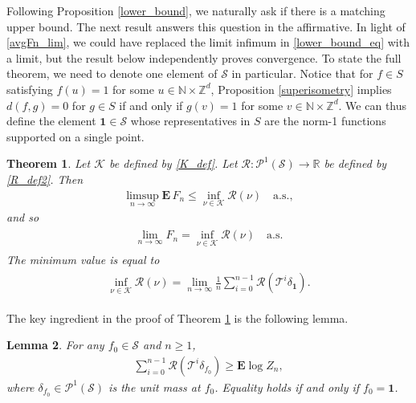 \documentclass[11pt,reqno]{amsart}
\numberwithin{equation}{section}
\newtheorem{thm}{Theorem}[section]
\newtheorem{lemma}[thm]{Lemma}
\theoremstyle{definition}
\begin{document}
Following Proposition \ref{lower_bound}, we naturally ask if there is a matching upper bound.
The next result answers this question in the affirmative.
In light of \eqref{avgFn_lim}, we could have replaced the limit infimum in \eqref{lower_bound_eq} with a limit, but the result below independently proves convergence.
To state the full theorem, we need to denote one element of ${\mathcal{S}}$ in particular.
Notice that for $f \in S$ satisfying $f(u) = 1$ for some $u \in {\mathbb{N}} \times {\mathbb{Z}}^d$, Proposition \ref{superisometry} implies $d(f,g) = 0$ for $g \in S$ if and only if $g(v) = 1$ for some $v \in {\mathbb{N}} \times {\mathbb{Z}}^d$.
We can thus define the element ${{\boldsymbol {1}}} \in {\mathcal{S}}$ whose representatives in $S$ are the norm-1 functions supported on a single point.

\begin{thm} \label{upper_bound}
Let ${\mathcal{K}}$ be defined by \eqref{K_def}.  
Let ${\mathcal{R}} : {\mathcal{P}}^1({\mathcal{S}}) \to {\mathbb{R}}$ be defined by \eqref{R_def2}.
Then
{\begin{align*} {
\limsup_{n \to \infty} {\mathbf{E}}\, F_n \leq \inf_{\nu \in {\mathcal{K}}} {\mathcal{R}}(\nu) \quad \mathrm{a.s.},
} \end{align*}}
and so
{\begin{align} \begin{split} {
\lim_{n \to \infty} F_n = \inf_{\nu \in {\mathcal{K}}} {\mathcal{R}}(\nu) \quad \mathrm{a.s.} \label{limit}
} \end{split} \end{align}}
The minimum value is equal to
{\begin{align} \begin{split} {
\inf_{\nu \in {\mathcal{K}}} {\mathcal{R}}(\nu) = \lim_{n \to \infty} \frac{1}{n} \sum_{i = 0}^{n-1} {\mathcal{R}}({\mathcal{T}}^i\delta_{{{\boldsymbol {1}}}}). \label{minimal_value}
} \end{split} \end{align}}
\end{thm}
The key ingredient in the proof of Theorem \ref{upper_bound} is the following lemma.

\begin{lemma} \label{upper_bound_lemma}
For any $f_0 \in {\mathcal{S}}$ and $n \geq 1$,
{\begin{align*} {
\sum_{i = 0}^{n-1} {\mathcal{R}}({\mathcal{T}}^i \delta_{f_0}) \geq {\mathbf{E}}\log Z_n,
} \end{align*}}
where $\delta_{f_0} \in {\mathcal{P}}^1({\mathcal{S}})$ is the unit mass at $f_0$.
Equality holds if and only if $f_0 = {{\boldsymbol {1}}}$.
\end{lemma}
\end{document}
